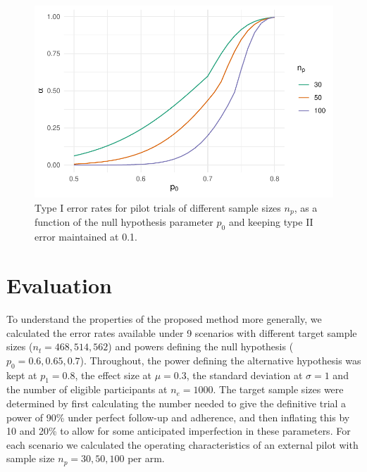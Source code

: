 \documentclass[AMA,STIX1COL]{WileyNJD-v2}
\begin{document}
\begin{figure}
\centering
\includegraphics[scale=0.8]{./Figures/alt.pdf}
\caption{Type I error rates for pilot trials of different sample sizes $n_p$, as a function of the null hypothesis parameter $p_0$ and keeping type II error maintained at 0.1.}
\label{fig:alt}
\end{figure}

\section{Evaluation}\label{sec:eval}

To understand the properties of the proposed method more generally, we calculated the error rates available under 9 scenarios with different target sample sizes ($n_t = 468, 514, 562$) and powers defining the null hypothesis ($p_0 = 0.6, 0.65, 0.7$). Throughout, the power defining the alternative hypothesis was kept at $p_1 = 0.8$, the effect size at $\mu = 0.3$, the standard deviation at $\sigma = 1$ and the number of eligible participants at $n_e = 1000$. The target sample sizes were determined by first calculating the number needed to give the definitive trial a power of 90\% under perfect follow-up and adherence, and then inflating this by 10 and 20\% to allow for some anticipated imperfection in these parameters. For each scenario we calculated the operating characteristics of an external pilot with sample size $n_p = 30, 50, 100$ per arm.

 
\end{document}
